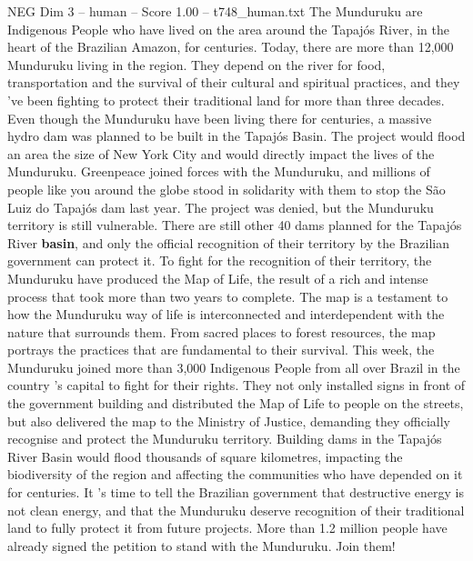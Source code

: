 \begin{textsample}{NEG Dim 3 – human – Score 1.00 – t748\_human.txt}  \label{ex:f3_neg_046}
The Munduruku are Indigenous People who have lived on the area around the Tapajós River, in the heart of the Brazilian Amazon, for centuries.
Today, there are more than 12,000 Munduruku living in the region.
They depend on the river for food, transportation and the survival of their cultural and spiritual practices, and they ’ve been fighting to protect their traditional land for more than three decades.
Even though the Munduruku have been living there for centuries, a massive hydro dam was planned to be built in the Tapajós Basin.
The project would flood an area the size of New York City and would directly impact the lives of the Munduruku.
Greenpeace joined forces with the Munduruku, and millions of people like you around the globe stood in solidarity with them to stop the São Luiz do Tapajós dam last year.
The project was denied, but the Munduruku territory is still vulnerable.
There are still other 40 dams planned for the Tapajós River \textbf{basin}, and only the official recognition of their territory by the Brazilian government can protect it.
To fight for the recognition of their territory, the Munduruku have produced the Map of Life, the result of a rich and intense process that took more than two years to complete.
The map is a testament to how the Munduruku way of life is interconnected and interdependent with the nature that surrounds them.
From sacred places to forest resources, the map portrays the practices that are fundamental to their survival.
This week, the Munduruku joined more than 3,000 Indigenous People from all over Brazil in the country ’s capital to fight for their rights.
They not only installed signs in front of the government building and distributed the Map of Life to people on the streets, but also delivered the map to the Ministry of Justice, demanding they officially recognise and protect the Munduruku territory.
Building dams in the Tapajós River Basin would flood thousands of square kilometres, impacting the biodiversity of the region and affecting the communities who have depended on it for centuries.
It ’s time to tell the Brazilian government that destructive energy is not clean energy, and that the Munduruku deserve recognition of their traditional land to fully protect it from future projects.
More than 1.2 million people have already signed the petition to stand with the Munduruku.
Join them!

\end{textsample}
